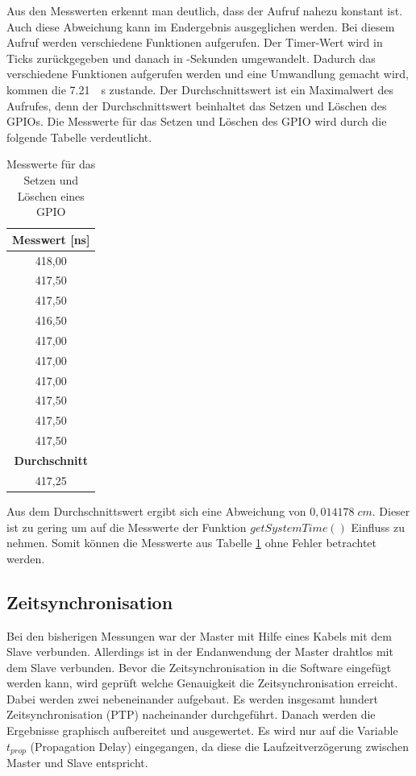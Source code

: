 Aus den Messwerten erkennt man deutlich, dass der Aufruf nahezu konstant ist. Auch diese Abweichung kann im Endergebnis ausgeglichen werden. Bei diesem Aufruf werden verschiedene Funktionen aufgerufen. Der Timer-Wert wird in Ticks zurückgegeben und danach in \si{\mu}-Sekunden umgewandelt. Dadurch das verschiedene Funktionen aufgerufen werden und eine Umwandlung gemacht wird, kommen die \SI{7,21}{\mu\s} zustande. Der Durchschnittswert ist ein Maximalwert des Aufrufes, denn der Durchschnittswert beinhaltet das Setzen und Löschen des GPIOs. Die Messwerte für das Setzen und Löschen des GPIO wird durch die folgende Tabelle verdeutlicht.

\begin{table}[H]
\centering
\caption{Messwerte für das Setzen und Löschen eines GPIO}
\label{table:modul_E2}
\begin{tabular}{|c|}
\hline
\textbf{Messwert [\si{ns}]} \\ \hline
418,00                     \\ \hline
417,50                     \\ \hline
417,50                     \\ \hline
416,50                     \\ \hline
417,00                     \\ \hline
417,00                     \\ \hline
417,00                     \\ \hline
417,50                     \\ \hline
417,50                     \\ \hline
417,50                     \\ \hline
\textbf{Durchschnitt}      \\ \hline
417,25                     \\ \hline
\end{tabular}
\end{table}

Aus dem Durchschnittswert ergibt sich eine Abweichung von $0,014178 \; cm$. Dieser ist zu gering um auf die Messwerte der Funktion $getSystemTime()$ Einfluss zu nehmen. Somit können die Messwerte aus Tabelle \ref{table:modul_E2} ohne Fehler betrachtet werden.


\subsection{Zeitsynchronisation}
Bei den bisherigen Messungen war der Master mit Hilfe eines Kabels mit dem Slave verbunden. Allerdings ist in der Endanwendung der Master drahtlos mit dem Slave verbunden. Bevor die Zeitsynchronisation in die Software eingefügt werden kann, wird geprüft welche Genauigkeit die Zeitsynchronisation erreicht. Dabei werden zwei \board \platz nebeneinander aufgebaut. Es werden insgesamt hundert Zeitsynchronisation (PTP) nacheinander durchgeführt. Danach werden die Ergebnisse graphisch aufbereitet und ausgewertet. Es wird nur auf die Variable $t_{prop}$ (Propagation Delay) eingegangen, da diese die Laufzeitverzögerung zwischen Master und Slave entspricht.
 
